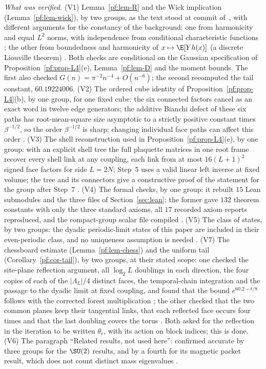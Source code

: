 \emph{What was verified.} (V1) Lemma~\ref{pf:lem-R} and the Wick implication (Lemma~\ref{pf:lem-wick}), by two groups, as the text stood at commit  of~\cite{Repo}, with different arguments for the constancy of the background: one from harmonicity and equal $L^2$ norms, with independence from conditional characteristic functions \cite[comment 7102490558]{RepoThread}; the other from boundedness and harmonicity of $x\mapsto\E[Yh(x)]$ (a discrete Liouville theorem) \cite[comment 7102590992]{RepoThread}. Both checks are conditional on the Gaussian specification of Proposition~\ref{pf:prop-L4}(e), Lemma~\ref{pf:lem-D} and the moment bounds. The first also checked $G(n)=\pi^{-2}n^{-4}+O(n^{-6})$; the second recomputed the tail constant, $60.19224006$. (V2) The ordered cube identity of Proposition~\ref{pf:prop-L4}(b), by one group, for one fixed cube: the six connected factors cancel as an exact word in twelve edge generators; the additive Bianchi defect of these six paths has root-mean-square size asymptotic to a strictly positive constant times $\beta^{-1/2}$, so the order $\beta^{-1/2}$ is sharp; changing individual face paths can affect this order \cite[comment 7104976877]{RepoThread}. (V3) The shell reconstruction used in Proposition~\ref{pf:prop-L4}(e), by one group: with an explicit shell tree the full plaquette matrices in one root frame recover every shell link at any coupling, each link from at most $16(L+1)^2$ signed face factors for side $L=2N$; Step~5 uses a valid linear left inverse at fixed volume; the tree and its connectors give a constructive proof of the statement for the group after Step~7 \cite[comment 7104825691]{RepoThread}. (V4) The formal checks, by one group: it rebuilt $15$ Lean submodules and the three files of Section~\ref{sec:lean}; the former gave $132$ theorem constants with only the three standard axioms, all $17$ recorded axiom reports reproduced, and the compact-group scalar file compiled \cite[comment 7105447358]{RepoThread}. (V5) The class of states, by two groups: the dyadic periodic-limit states of this paper are included in their even-periodic class, and no uniqueness assumption is needed \cite[comments 7105290349, 7105296546]{RepoThread}. (V7) The chessboard estimate (Lemma~\ref{pf:lem-chess}) and the uniform tail (Corollary~\ref{pf:cor-tail}), by two groups, at their stated scope: one checked the site-plane reflection argument, all $\log_2L$ doublings in each direction, the four copies of each of the $|\Lambda_L|/4$ distinct faces, the temporal-chain integration and the passage to the dyadic limit at fixed coupling, and found that the bound $e^{60.2-t/8}$ follows with the corrected forest multiplication \cite[comment 7105946691]{RepoThread}; the other checked that the two common planes keep their tangential links, that each reflected face occurs four times and that the last doubling covers the torus \cite[comment 7105949912]{RepoThread}. Both asked for the reflection in the iteration to be written $\theta_r$, with its action on block indices; this is done. (V6) The paragraph ``Related results, not used here'': confirmed accurate by three groups for the $\SU(2)$ results, and by a fourth for its magnetic packet result, which does not count distinct mass eigenvalues \cite[comments 7105447358, 7105100783, 7105296546, 7105348719]{RepoThread}.

